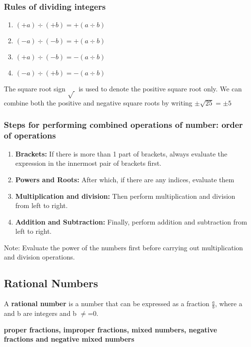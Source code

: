 \documentclass[../main]{subfiles}
\begin{document}
\subsubsection{Rules of dividing integers}
\begin{enumerate}
\item \((+a) \div (+b) = + ( a \div b)\)
\item \((-a) \div (-b) = +(a \div b)\)
\item \((+a) \div (-b) = - (a \div b)\)
\item \((-a) \div (+b) = -(a \div b)\)
\end{enumerate}

The square root sign \(\sqrt {\ }\) is used to denote the positive square
  root only.  We can combine both the positive and negative square roots by
writing \(\pm \sqrt {25} = \pm 5\)

\subsubsection{Steps for performing combined operations of number: order of operations}
\begin{enumerate}
\item \textbf{Brackets:} If there is more than 1 part of brackets, always evaluate the expression
  in the innermost pair of brackets first.
\item \textbf{Powers and Roots:} After which, if there are any indices, evaluate them
\item \textbf{Multiplication and division:} Then perform multiplication and division from left to right.
\item \textbf{Addition and Subtraction:} Finally, perform addition and subtraction from left to right.
\end{enumerate}

Note: Evaluate the power of the numbers first before carrying out multiplication
and division operations.

\subsection{Rational Numbers}

A \textbf{rational number} is a number that can be expressed as a fraction
\(\frac a b\), where a and b are integers and b \(\neq\)=0.


\textbf{proper fractions, improper fractions, mixed numbers, negative fractions and negative
  mixed numbers}
\end{document}
